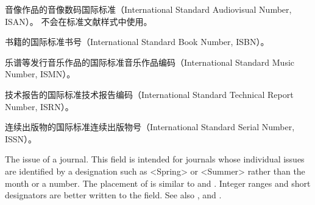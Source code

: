 \begin{fieldlist}



音像作品的音像数码国际标准（International Standard Audiovisual Number,  ISAN）。
不会在标准文献样式中使用。




书籍的国际标准书号（International Standard Book Number, ISBN）。




乐谱等发行音乐作品的国际标准音乐作品编码（International Standard Music Number,  ISMN）。




技术报告的国际标准技术报告编码（International Standard Technical Report Number,  ISRN）。




连续出版物的国际标准连续出版物号（International Standard Serial Number,  ISSN）。



The issue of a journal. This field is intended for journals whose individual issues are identified by a designation such as <Spring> or <Summer> rather than the month or a number. The placement of  is similar to  and . Integer ranges and short designators are better written to the  field. See also ,  and .


\end{fieldlist}
